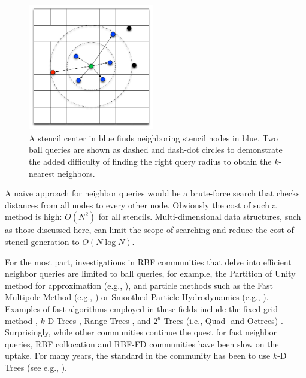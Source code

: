 \documentclass{report}
\begin{document}
\begin{figure}
\centering
\includegraphics[width=5.5cm]{rbffd_methods_content/neighbors/ball_query_vs_kNN.png}
\caption{A stencil center in blue finds neighboring stencil nodes in blue. Two ball queries are shown as dashed and dash-dot circles to demonstrate the added difficulty of finding the right query radius to obtain the $k$-nearest neighbors.}
\label{fig:nearest_neighbor_example}
\end{figure}


A na\"{i}ve approach for neighbor queries would be a brute-force search that checks distances from all nodes to every other node. Obviously the cost of such a method is high: $O(N^2)$ for all stencils. Multi-dimensional data structures, such as those discussed here, can limit the scope of searching and reduce the cost of stencil generation to $O(N \log{N})$. 

For the most part, investigations in RBF communities that delve into efficient neighbor queries are limited to ball queries, for example, the Partition of Unity method for approximation (e.g., \cite{Wendland2002,WendlandBook}), and particle methods such as the Fast Multipole Method (e.g., \cite{Ying2006, Gumerov2003}) or Smoothed Particle Hydrodynamics (e.g., \cite{Krog2010}). Examples of fast algorithms employed in these fields include the fixed-grid method \cite{WendlandBook,Krog2010}, $k$-D Trees \cite{WendlandBook}, Range Trees \cite{Wendland2002,WendlandBook}, and $2^d$-Trees (i.e., Quad- and Octrees) \cite{Gumerov2003, Ying2006}. Surprisingly, while other communities continue the quest for fast neighbor queries, RBF collocation and RBF-FD communities have been slow on the uptake. For many years, the standard in the community has been to use $k$-D Trees (see e.g., \cite{Fasshauer2007, FlyerLehto11,FornbergLehto11}). 
\end{document}
